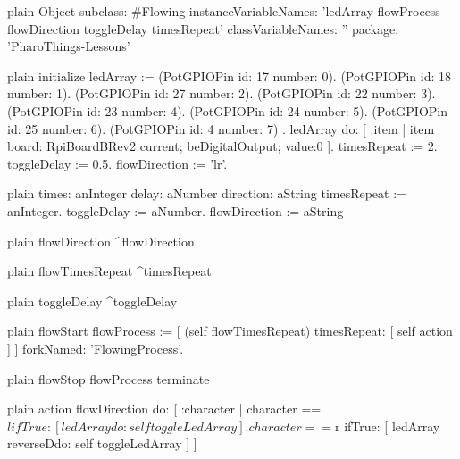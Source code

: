 \documentclass[10pt,twoside,english]{_support/latex/sbabook/sbabook}
\begin{document}
\begin{displaycode}{plain}
Object subclass: #Flowing
	instanceVariableNames: 'ledArray flowProcess flowDirection toggleDelay timesRepeat'
	classVariableNames: ''
	package: 'PharoThings-Lessons'
\end{displaycode}

\begin{displaycode}{plain}
initialize
	ledArray := { 
	(PotGPIOPin id: 17 number: 0).
	(PotGPIOPin id: 18 number: 1).
	(PotGPIOPin id: 27 number: 2).
	(PotGPIOPin id: 22 number: 3).
	(PotGPIOPin id: 23 number: 4).
	(PotGPIOPin id: 24 number: 5).
	(PotGPIOPin id: 25 number: 6).
	(PotGPIOPin id: 4 number: 7)
	}.
   ledArray do: [ :item | item board: RpiBoardBRev2 current; beDigitalOutput; value:0 ].
	timesRepeat := 2.
	toggleDelay := 0.5.
	flowDirection := 'lr'.
\end{displaycode}

\begin{displaycode}{plain}
times: anInteger delay: aNumber direction: aString
	timesRepeat := anInteger.
	toggleDelay := aNumber.
	flowDirection := aString
\end{displaycode}

\begin{displaycode}{plain}
flowDirection
	^flowDirection
\end{displaycode}

\begin{displaycode}{plain}
flowTimesRepeat
	^timesRepeat
\end{displaycode}

\begin{displaycode}{plain}
toggleDelay
	 ^toggleDelay
\end{displaycode}

\begin{displaycode}{plain}
flowStart
	flowProcess := [ (self flowTimesRepeat) timesRepeat: [
          self action
      ] ] forkNamed: 'FlowingProcess'.
\end{displaycode}

\begin{displaycode}{plain}
flowStop
	flowProcess terminate
\end{displaycode}

\begin{displaycode}{plain}
action  
flowDirection do: [ :character | character == $l ifTrue: [ ledArray do: self toggleLedArray  ]. 
                        character == $r ifTrue: [ ledArray reverseDdo: self toggleLedArray  ] ] 
\end{displaycode}
\end{document}
